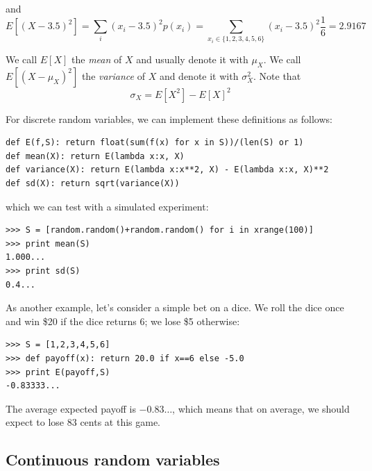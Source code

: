 \documentclass[justified,sixbynine]{tufte-book}
\def\ft{\small\tt}
\theoremstyle{plain}%
\theoremstyle{definition}
\theoremstyle{remark}
\begin{document}
\begin{fullwidth}
and
\begin{equation}
E[(X-3.5)^2]=\sum_i(x_i-3.5)^2p(x_i)=\sum_{x_i\in
\{1,2,3,4,5,6\}}(x_i-3.5)^2\frac 16=2.9167
\end{equation}

We call $E[X]$ the {\it mean} of $X$ and usually denote it with $\mu _X$.
We call $E[(X-\mu _X)^2]$ the {\it variance} of $X$ and denote it with $\sigma _X^2$. Note that
\begin{equation}
\sigma _X=E[X^2]-E[X]^2
\end{equation}

For discrete random variables, we can implement these definitions as follows:

\begin{lstlisting}[caption={in file: {\ft nlib.py}}]
def E(f,S): return float(sum(f(x) for x in S))/(len(S) or 1)
def mean(X): return E(lambda x:x, X)
def variance(X): return E(lambda x:x**2, X) - E(lambda x:x, X)**2
def sd(X): return sqrt(variance(X))
\end{lstlisting}

which we can test with a simulated experiment:

\begin{lstlisting}[caption={in file: {\ft nlib.py}}]
>>> S = [random.random()+random.random() for i in xrange(100)]
>>> print mean(S)
1.000...
>>> print sd(S)
0.4...
\end{lstlisting}

As another example, let's consider a simple bet on a dice. We roll the dice once and win \$20 if the dice returns 6; we lose \$5 otherwise:

\begin{lstlisting}[caption={in file: {\ft nlib.py}}]
>>> S = [1,2,3,4,5,6]
>>> def payoff(x): return 20.0 if x==6 else -5.0
>>> print E(payoff,S)
-0.83333...
\end{lstlisting}

The average expected payoff is $-0.83\dots$, which means that on average, we should expect to lose 83 cents at this game.

\goodbreak\subsection{Continuous random variables}


\end{fullwidth}
\end{document}
